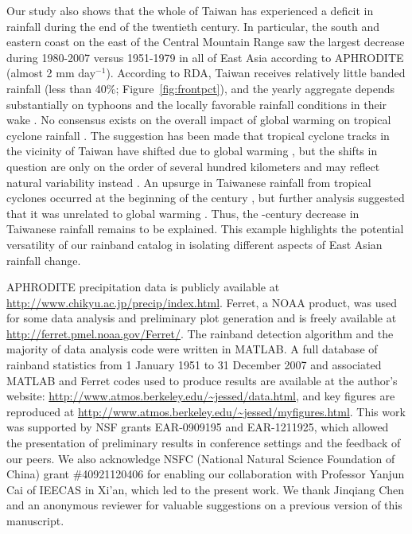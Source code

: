\documentclass{ametsoc}
\begin{document}
	Our study also shows that the whole of Taiwan has experienced a deficit in rainfall during the end of the twentieth century. In particular, the south and eastern coast on the east of the Central Mountain Range saw the largest decrease during 1980-2007 versus 1951-1979 in all of East Asia according to APHRODITE (almost 2 mm day$^{-1}$). According to RDA, Taiwan receives relatively little banded rainfall (less than 40\%; Figure~\ref{fig:frontpct}), and the yearly aggregate depends substantially on typhoons and the locally favorable rainfall conditions in their wake \citep{Chen2011}. No consensus exists on the overall impact of global warming on tropical cyclone rainfall \citep{Wehner2015}. The suggestion has been made that tropical cyclone tracks in the vicinity of Taiwan have shifted due to global warming \citep{Wang2011}, but the shifts in question are only on the order of several hundred kilometers and may reflect natural variability instead \citep{Chan2006}. An upsurge in Taiwanese rainfall from tropical cyclones occurred at the beginning of the  century \citep{Tu2009}, but further analysis suggested that it was unrelated to global warming \citep{Chang2013}. Thus, the -century decrease in Taiwanese rainfall remains to be explained. This example highlights the potential versatility of our rainband catalog in isolating different aspects of East Asian rainfall change.

%
\acknowledgments
APHRODITE precipitation data is publicly available at \url{http://www.chikyu.ac.jp/precip/index.html}. Ferret, a NOAA product, was used for some data analysis and preliminary plot generation and is freely available at \url{http://ferret.pmel.noaa.gov/Ferret/}. The rainband detection algorithm and the majority of data analysis code were written in MATLAB. A full database of rainband statistics from 1 January 1951 to 31 December 2007 and associated MATLAB and Ferret codes used to produce results are available at the author's website: \url{http://www.atmos.berkeley.edu/~jessed/data.html}, and key figures are reproduced at \url{http://www.atmos.berkeley.edu/~jessed/myfigures.html}. This work was supported by NSF grants EAR-0909195 and EAR-1211925, which allowed the presentation of preliminary results in conference settings and the feedback of our peers. We also acknowledge NSFC (National Natural Science Foundation of China) grant \#40921120406 for enabling our collaboration with Professor Yanjun Cai of IEECAS in Xi'an, which led to the present work. We thank Jinqiang Chen and an anonymous reviewer for valuable suggestions on a previous version of this manuscript.
\end{document}
